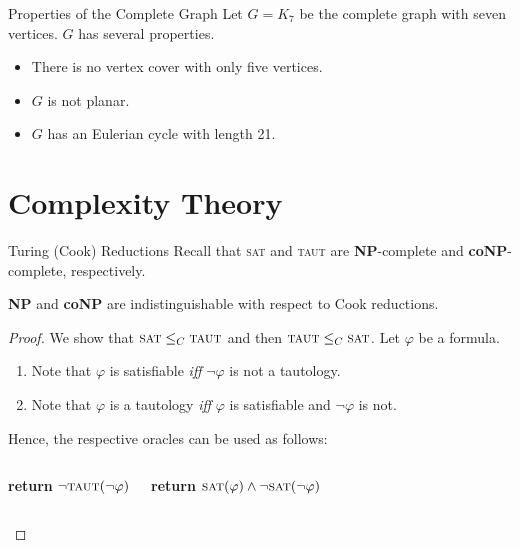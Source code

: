 \documentclass[10pt,aspectratio=169,english]{beamer}
\begin{document}
\begin{frame}{Properties of the Complete Graph}
Let $G=K_7$ be the complete graph with seven vertices. $G$ has several properties.
\begin{example}
\begin{itemize}[<+- | alert@+>]
	\item There is no vertex cover with only five vertices.
	\item $G$ is not planar\alert<4>{.}
	\item $G$ has an Eulerian cycle with length 21.
\end{itemize}
\end{example}
\end{frame}

\section{Complexity Theory}

\begin{frame}{Turing (Cook) Reductions}
Recall that \textsc{sat} and \textsc{taut} are \textbf{NP}-complete and \textbf{coNP}-complete, respectively.
\begin{theorem}
\textbf{NP} and \textbf{coNP} are indistinguishable with respect to Cook reductions.
\end{theorem}
\begin{proof}
We show that $\textsc{sat} \leq_C \textsc{taut}$ and then $\textsc{taut} \leq_C \textsc{sat}$. Let $\varphi$ be a formula.
\begin{enumerate}
	\item Note that $\varphi$ is satisfiable \textit{iff} $\neg \varphi$ is not a tautology.
	
	\item Note that $\varphi$ is a tautology \textit{iff} $\varphi$ is satisfiable and $\neg\varphi$ is not.
\end{enumerate}
Hence, the respective oracles can be used as follows:
\begin{columns}[T,onlytextwidth]
\begin{algorithmic}[1]
            \State \textbf{return} $\neg \textsc{taut}(\neg \varphi)$
        \EndProcedure
    \end{algorithmic}
	\begin{algorithmic}[1]
            \State \textbf{return} $\textsc{sat}(\varphi) \land \neg \textsc{sat}(\neg \varphi)$
        \EndProcedure
    \end{algorithmic}
    \end{columns}
\end{proof}
\end{frame}
\end{document}
